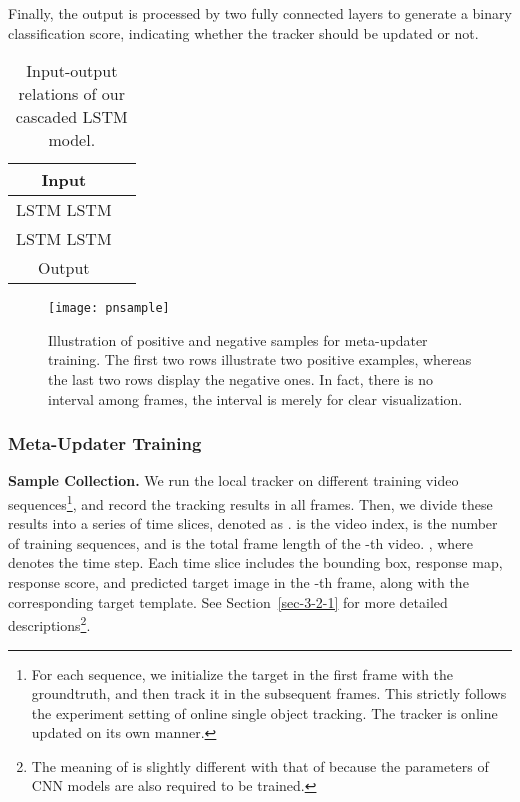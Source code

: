 \documentclass[10pt,twocolumn,letterpaper]{article}
\begin{document}
Finally, the output  is processed by two fully connected layers to
generate a binary classification score, indicating whether the tracker should be
updated or not.

\begin{table}[t]
\caption{Input-output relations of our cascaded LSTM model. }
\label{tab:lstminout}
\small
\begin{tabular}{|c|l|}
\hline
Input             & \\
\hline
LSTM  LSTM  & \\
\hline
LSTM  LSTM  & \\
\hline
Output          &\\
\hline
\end{tabular}
\vspace{-6mm}
\end{table}

\begin{figure*}[htbp]
	\begin{center}
		\texttt{[image: pnsample]}
	\end{center}
	\vspace{-4mm}
	\caption{Illustration of positive and negative samples for meta-updater training. The first two rows illustrate
	two positive examples, whereas the last two rows display the negative ones. In fact,  there is no interval among
	frames, the interval  is merely for clear visualization. }
	\label{fig-pnsample}
	\vspace{-5mm}
\end{figure*}

\vspace{-5mm}
\subsubsection{Meta-Updater Training}
\vspace{-2mm}
\noindent \textbf{Sample Collection.} We run the local tracker on different training
video sequences\footnote{For each sequence, we initialize the target in the first frame
with the groundtruth, and then track it in the subsequent frames. This strictly follows
the experiment setting of online single object tracking. The tracker is online updated
on its own manner.}, and record the tracking results in all frames.
Then, we divide these results into a series of time slices, denoted as
.  is the video index,  is the number of training
sequences, and  is the total frame length of the -th video.
, where  denotes the time step.
Each time slice  includes the bounding box, response map, response
score, and predicted target image in the -th frame, along with the corresponding
target template.
See Section~\ref{sec-3-2-1} for more detailed descriptions\footnote{The meaning
of  is slightly different with that of  because the
parameters of CNN models are also required to be trained.}.
\end{document}
